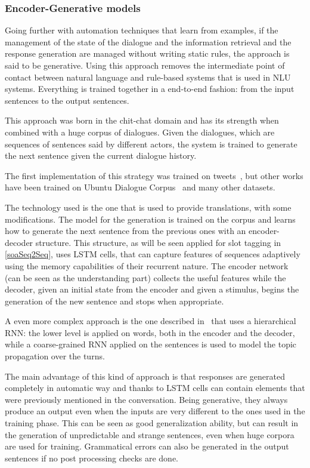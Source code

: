 \subsubsection{Encoder-Generative models}
\label{soaGenerativeApproach}

Going further with automation techniques that learn from examples, if the management of the state of the dialogue and the information retrieval and the response generation are managed without writing static rules, the approach is said to be generative. Using this approach removes the intermediate point of contact between natural language and rule-based systems that is used in NLU systems. Everything is trained together in a end-to-end fashion: from the input sentences to the output sentences.

This approach was born in the chit-chat domain and has its strength when combined with a huge corpus of dialogues. Given the dialogues, which are sequences of sentences said by different actors, the system is trained to generate the next sentence given the current dialogue history.

The first implementation of this strategy was trained on tweets~\cite{ritter2011data}, but other works have been trained on Ubuntu Dialogue Corpus~\cite{lowe2015ubuntu} and many other datasets.

The technology used is the one that is used to provide translations, with some modifications. The model for the generation is trained on the corpus and learns how to generate the next sentence from the previous ones with an encoder-decoder structure. This structure, as will be seen applied for slot tagging in \ref{soaSeq2Seq}, uses LSTM cells, that can capture features of sequences adaptively using the memory capabilities of their recurrent nature. The encoder network (can be seen as the understanding part) collects the useful features while the decoder, given an initial state from the encoder and given a stimulus, begins the generation of the new sentence and stops when appropriate.

A even more complex approach is the one described in~\cite{serban2016building} that uses a hierarchical RNN: the lower level is applied on words, both in the encoder and the decoder, while a coarse-grained RNN applied on the sentences is used to model the topic propagation over the turns.

The main advantage of this kind of approach is that responses are generated completely in automatic way and thanks to LSTM cells can contain elements that were previously mentioned in the conversation. Being generative, they always produce an output even when the inputs are very different to the ones used in the training phase. This can be seen as good generalization ability, but can result in the generation of unpredictable and strange sentences, even when huge corpora are used for training. Grammatical errors can also be generated in the output sentences if no post processing checks are done.

